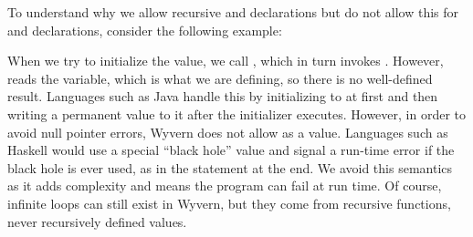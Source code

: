 \documentclass{article}
\begin{document}
\begin{mdP}[class={indent},data-line={427}]%
{}To understand why we allow recursive %
{}%
{} and %
{}%
{} declarations
but do not allow this for %
{}%
{} and %
{}%
{} declarations, consider
the following example:%
\end{mdP}%
\begin{mdPre}[class={para-block,pre-indented},data-line={431}]%
%
\end{mdPre}%
\begin{mdP}[data-line={441}]%
{}When we try to initialize the %
{}%
{} value, we call %
{}%
{}, which in
turn invokes %
{}%
{}.  However, %
{}%
{} reads the %
{}%
{} variable, which
is what we are defining, so there is no well-defined result.  Languages
such as Java handle this by initializing %
{}%
{} to %
{}%
{} at first and
then writing a permanent value to it after the initializer executes.
However, in order to avoid null pointer errors, Wyvern does not allow
{}%
{} as a value.  Languages such as Haskell would use a special
{}{\textquotedblleft}black hole{\textquotedblright}%
{} value and signal a run-time error if the black hole is
ever used, as in the %
{}%
{} statement at the end.
We avoid this semantics as it adds complexity and means the
program can fail at run time.  Of course, infinite loops can still
exist in Wyvern, but they come from recursive functions, never
recursively defined values.%
\end{mdP}%
\end{document}
